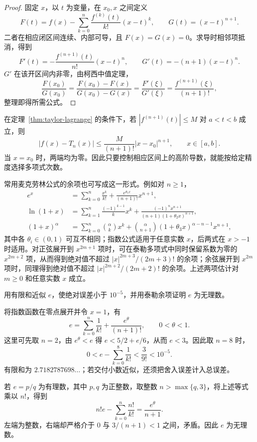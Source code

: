 \documentclass[UTF8,12pt,a4paper,fontset=fandol]{ctexbook}
\begin{document}
\begin{proof}
固定 $x$，以 $t$ 为变量，在 $x_0,x$ 之间定义
\[
    F(t)=f(x)-\sum_{k=0}^n\frac{f^{(k)}(t)}{k!}(x-t)^k,
    \qquad G(t)=(x-t)^{n+1}.
\]
二者在相应闭区间连续、内部可导，且 $F(x)=G(x)=0$。求导时相邻项抵消，得到
\[
    F'(t)=-\frac{f^{(n+1)}(t)}{n!}(x-t)^n,
    \qquad G'(t)=-(n+1)(x-t)^n.
\]
$G'$ 在该开区间内非零，由柯西中值定理，
\[
    \frac{F(x_0)}{G(x_0)}
    =\frac{F(x_0)-F(x)}{G(x_0)-G(x)}
    =\frac{F'(\xi)}{G'(\xi)}
    =\frac{f^{(n+1)}(\xi)}{(n+1)!},
\]
整理即得所需公式。
\end{proof}

\begin{corollary}[泰勒逼近的误差界]
\label{cor:taylor-lagrange-error-bound}
在定理~\ref{thm:taylor-lagrange} 的条件下，若 $|f^{(n+1)}(t)|\leq M$ 对 $a<t<b$ 成立，则
\begin{equation}
    |f(x)-T_n(x)|\leq\frac{M}{(n+1)!}|x-x_0|^{n+1},
    \qquad x\in[a,b].
    \label{eq:taylor-lagrange-error-bound}
\end{equation}
当 $x=x_0$ 时，两端均为零。因此只要控制相应区间上的高阶导数，就能按给定精度选择多项式次数。
\end{corollary}

常用麦克劳林公式的余项也可写成这一形式。例如对 $n\geq1$，
\begin{align*}
    e^x&=\sum_{k=0}^n\frac{x^k}{k!}
        +\frac{e^{\theta_1x}}{(n+1)!}x^{n+1},\\
    \ln(1+x)&=\sum_{k=1}^n\frac{(-1)^{k-1}}k x^k
        +\frac{(-1)^nx^{n+1}}{(n+1)(1+\theta_2x)^{n+1}},\\
    (1+x)^\alpha&=\sum_{k=0}^n\binom\alpha k x^k
        +\binom\alpha{n+1}(1+\theta_3x)^{\alpha-n-1}x^{n+1},
\end{align*}
其中各 $\theta_i\in(0,1)$ 可互不相同；指数公式适用于任意实数 $x$，后两式在 $x>-1$ 时适用。对正弦展开到 $x^{2m+1}$ 项时，可在泰勒多项式中同时保留系数为零的 $x^{2m+2}$ 项，从而得到绝对值不超过 $|x|^{2m+3}/(2m+3)!$ 的余项；余弦展开到 $x^{2m}$ 项时，同理得到绝对值不超过 $|x|^{2m+2}/(2m+2)!$ 的余项。上述两项估计对 $m\geq0$ 和任意实数 $x$ 成立。

\begin{example}
\label{ex:taylor-approximation-and-irrationality-of-e}
用有限和近似 $e$，使绝对误差小于 $10^{-5}$，并用泰勒余项证明 $e$ 为无理数。
\end{example}

\begin{solve}
将指数函数在零点展开并令 $x=1$，有
\[
    e=\sum_{k=0}^n\frac1{k!}+\frac{e^\theta}{(n+1)!},
    \qquad 0<\theta<1.
\]
这里可先取 $n=2$，由 $e^\theta<e$ 得 $e<5/2+e/6$，从而 $e<3$。因此取 $n=8$ 时，
\[
    0<e-\sum_{k=0}^8\frac1{k!}<\frac3{9!}<10^{-5}.
\]
有限和为 $2.7182787698\ldots$；若交付小数近似，还须把舍入误差计入总误差。

若 $e=p/q$ 为有理数，其中 $p,q$ 为正整数，取整数 $n>\max\{q,3\}$，将上述等式乘以 $n!$，得到
\[
    n!e-\sum_{k=0}^n\frac{n!}{k!}=\frac{e^\theta}{n+1}.
\]
左端为整数，右端却严格介于 $0$ 与 $3/(n+1)<1$ 之间，矛盾。因此 $e$ 为无理数。
\end{solve}
\end{document}
